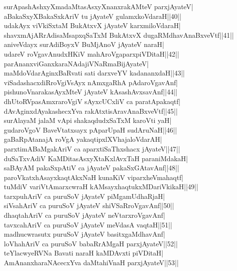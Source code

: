 \documentclass{article}
\begin{document}
surApashAshxyXmadaMtasAsxyXnanxrakAMteV parxjAyateV|\\
aBakaSxyXBakaSxkAriV tu jAyateV gulamxkoVdaraH||40||\\
udakAyx viVkiSxtaM BukAtxvX jAyateV karxmiloVdaraH|\\
shavxmAjARrAdisaMsapxqSaTxM BukAtxvX dugaRMdhavAnaBxveVtf||41||\\
aniveVdayx surAdiBoyxV BuMjAnoV jAyateV naraH|\\
udareV roVgavAnudxHKiV mahAroVgaparxpiVDitaH||42||\\
parAnanxviGanxkaraNAdajiVNaRmaBijAyateV|\\
maMdoVdarAginxBaRvati sati darxveYV kadananxdaH||43||\\
viSadashacxdiRroVgiVsAyx nAmxgaRhA pAdaroVgavAnf|\\
pishunoVnarakasAyxMteV jAyateV kAsashAvxsavAnf||44||\\
dhUtoRVpasAmxraroVgiV sAyxcUCxliV ca paratApakaqtf|\\
dAvAginxdAyakashecxYva rakAtxtisAravAnaBxveVtf||45||\\
surAlayaM jalaM vApi shakaqdudxSaTxM karoVti yaH|\\
gudaroVgoV BaveVtatxsayx pAparUpaH sudAruNaH||46||\\
gaBaRpAtanajA roVgA yakaqtipxlXVhajaloVdarAH|\\
parxtimABaMgakAriV ca aparxtiSaThxshacx jAyateV||47||\\
duSaTxvAdiV KaMDitasAsxyXtaKxlAvxTaH paraniMdakaH|\\
saBAyAM pakaSxpAtiV ca jAyateV pakaSxGAtavAnf||48||\\
paroVkatxhAsayxkaqtAkxNaH kunaKiV viparxheVmahaqtf|\\
tuMdiV variVtAmarxcwraH kAMsayxhaqtukxMDariVkikaH||49||\\
tarxpuhAriV ca puruSoV jAyateV piMgamUdhaRjaH|\\
siVsahAriV ca puruSoV jAyateV shiVSaRroVgavAnf||50||\\
dhaqtahAriV ca puruSoV jAyateV neVtarxroVgavAnf|\\
tavxcahAriV ca puruSoV jAyateV meVdasA vaqtaH||51||\\
madhucwrasutx puruSoV jAyateV basitxgaMdhavAnf|\\
loVhahAriV ca puruSoV babaRrAMgaH parxjAyateV||52||\\
teYlacwyeRVNa Bavati naraH kaMDAvxti piVDitaH|\\
AmAnanxharaNAcecxYva daMtahiVnaH parxjAyateV||53||\\
\end{document}
